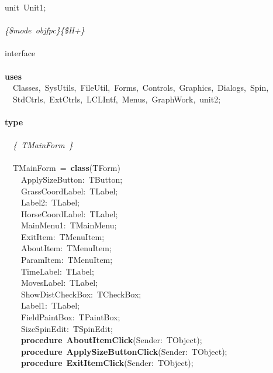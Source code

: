 \noindent
\mbox{}unit\ Unit1; \\
\mbox{} \\
\mbox{}\textit{\{\$mode\ objfpc\}\{\$H+\}} \\
\mbox{} \\
\mbox{}interface \\
\mbox{} \\
\mbox{}\textbf{uses} \\
\mbox{}\ \ Classes,\ SysUtils,\ FileUtil,\ Forms,\ Controls,\ Graphics,\ Dialogs,\ Spin, \\
\mbox{}\ \ StdCtrls,\ ExtCtrls,\ LCLIntf,\ Menus,\ GraphWork,\ unit2; \\
\mbox{} \\
\mbox{}\textbf{type} \\
\mbox{} \\
\mbox{}\ \ \textit{\{\ TMainForm\ \}} \\
\mbox{} \\
\mbox{}\ \ TMainForm\ =\ \textbf{class}(TForm) \\
\mbox{}\ \ \ \ ApplySizeButton:\ TButton; \\
\mbox{}\ \ \ \ GrassCoordLabel:\ TLabel; \\
\mbox{}\ \ \ \ Label2:\ TLabel; \\
\mbox{}\ \ \ \ HorseCoordLabel:\ TLabel; \\
\mbox{}\ \ \ \ MainMenu1:\ TMainMenu; \\
\mbox{}\ \ \ \ ExitItem:\ TMenuItem; \\
\mbox{}\ \ \ \ AboutItem:\ TMenuItem; \\
\mbox{}\ \ \ \ ParamItem:\ TMenuItem; \\
\mbox{}\ \ \ \ TimeLabel:\ TLabel; \\
\mbox{}\ \ \ \ MovesLabel:\ TLabel; \\
\mbox{}\ \ \ \ ShowDistCheckBox:\ TCheckBox; \\
\mbox{}\ \ \ \ Label1:\ TLabel; \\
\mbox{}\ \ \ \ FieldPaintBox:\ TPaintBox; \\
\mbox{}\ \ \ \ SizeSpinEdit:\ TSpinEdit; \\
\mbox{}\ \ \ \ \textbf{procedure}\ \textbf{AboutItemClick}(Sender:\ TObject); \\
\mbox{}\ \ \ \ \textbf{procedure}\ \textbf{ApplySizeButtonClick}(Sender:\ TObject); \\
\mbox{}\ \ \ \ \textbf{procedure}\ \textbf{ExitItemClick}(Sender:\ TObject); \\
